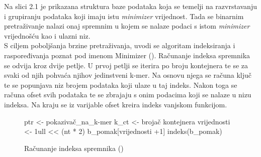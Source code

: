 \documentclass[times, utf8, zavrsni]{fer}
\begin{document}
Na slici 2.1 je prikazana struktura baze podataka koja se temelji na razvrstavanju i grupiranju podataka koji imaju istu \textit{minimizer} vrijednost. Tada se binarnim pretraživanje nalazi onaj spremnim u kojem se nalaze podaci s istom \textit{minimizer} vrijednošću kao i ulazni niz.
\\S ciljem poboljšanja brzine pretraživanja, uvodi se algoritam indeksiranja i raspoređivanja poznat pod imenom Minimizer (\cite{minim}). Računanje indeksa spremnika se odvija kroz dvije petlje. U prvoj petlji se iterira po broju kontejnera te se za svaki od njih pohvaća njihov jedinstveni k-mer. Na osnovu njega se računa ključ te se popunjava niz brojem podataka koji ulaze u taj indeks. Nakon toga se računa ofset svih podataka te se zbrajaju s onim podacima koji se nalaze u nizu indeksa. Na kraju se iz varijable ofset kreira indeks vanjskom funkcijom.
 
\begin{figure}[hbp]
	\begin{algorithm}[H]
		ptr <- pokazivač\_na\_k-mer\;
		k\_ct <- brojač kontejnera\;
		vrijednosti <- 1ull << (nt * 2)\;
		b\_pomak[vrijednosti +1]\;
		indeks(b\_pomak)\;
		\caption{Računanje indeksa spremnika (\cite{Kraken})}
		\label{Indeks}
	\end{algorithm}
\end{figure}
\end{document}
